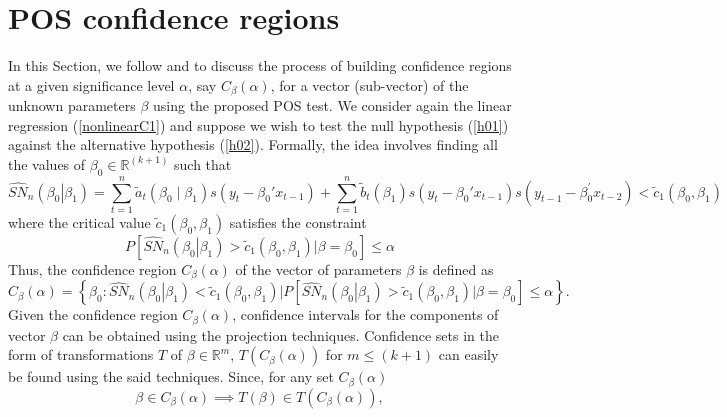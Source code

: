 \documentclass[harvard,11pt]{article}
\begin{document}
\section{POS confidence regions \label{POS confidence regions}}

In this Section, we follow \citet{dufour2010exact} and \citet{coudin2009finite} to discuss the process of building confidence regions at a given
significance level $\alpha $, say $C_{\beta }(\alpha )$, for a vector
(sub-vector) of the unknown parameters $\beta $ using the proposed POS test.
 We consider again the linear regression (\ref{nonlinearC1}) and
suppose we wish to test the null hypothesis (\ref{h01})
against the alternative hypothesis (\ref{h02}). Formally, the idea
involves finding all the values of $\beta _{0}\in \mathbb{R}^{(k+1)}$ such
that
\begin{equation}
\widehat{SN}_{n}(\left. \beta _{0}\right\vert \beta
_{1})=\sum\limits_{t=1}^{n}\tilde{a}_{t}(\beta_0\mid\beta _{1})s(y_{t}-\beta
_{0}'x_{t-1})+\sum\limits_{t=1}^{n}\tilde{b}_{t}(\beta
_{1})s(y_{t}-\beta _{0}'x_{t-1})s(y_{t-1}-\beta _{0}^{\prime
}x_{t-2})<\tilde{c}_1(\beta _{0},\beta _{1})  \label{decision}
\end{equation}%
where the critical value $\tilde{c}_1(\beta _{0},\beta _{1})$ satisfies the constraint
\begin{equation*}
P\left[\widehat{SN}_{n}(\left. \beta _{0}\right\vert \beta
_{1})>\tilde{c}_1(\beta _{0},\beta _{1}) |\beta =\beta _{0}\right]\leq\alpha 
\end{equation*}%
Thus, the confidence region $C_{\beta}(\alpha)$ of the vector of parameters $\beta $ is defined as
\begin{equation*}
C_{\beta }(\alpha )=\left\{ \beta _{0}:\widehat{SN}_{n}(\left. \beta _{0}\right\vert \beta
_{1})<\tilde{c}_1(\beta _{0},\beta _{1}) |P[\widehat{SN}_{n}(\left. \beta _{0}\right\vert \beta
_{1})>\tilde{c}_1(\beta _{0},\beta _{1}) |\beta =\beta _{0}]\leq \alpha \right\} .
\end{equation*}%
Given the confidence region $C_{\beta }(\alpha )$, confidence intervals for the components of vector $\beta $ can be obtained using the
projection techniques. Confidence sets in the form of transformations $T$ of $\beta\in%
\mathbb{R}^{m}$, $T(C_{\beta }(\alpha ))$ for $m\leq (k+1)$ can easily be found using the said techniques. Since, for any set $C_{\beta }(\alpha )$
\begin{equation}
\beta \in C_{\beta }(\alpha )\implies T(\beta )\in T(C_{\beta }(\alpha )),
\label{cr1C1}
\end{equation}%
\end{document}
